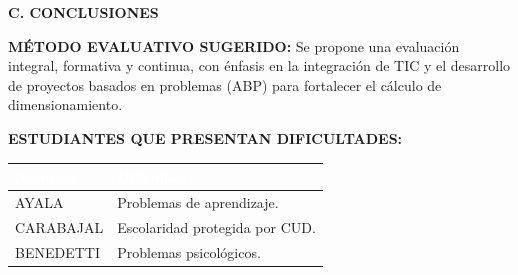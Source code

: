 \documentclass[a4paper,12pt]{article}
\begin{document}
\vspace{0.5cm}

\begin{center}\fontsize{12pt}{14pt}\selectfont \textbf{\uppercase{C. CONCLUSIONES}}\end{center}

\textbf{MÉTODO EVALUATIVO SUGERIDO:}
Se propone una evaluación integral, formativa y continua, con énfasis en la integración de TIC y el desarrollo de proyectos basados en problemas (ABP) para fortalecer el cálculo de dimensionamiento.

\vspace{0.3cm}
\textbf{ESTUDIANTES QUE PRESENTAN DIFICULTADES:}

\begin{center}
\begin{tabular}{|p{7cm}|p{8cm}|}
  \hline
  \rowcolor{headerblue}
  \textcolor{white}{\textbf{Alumnos}} & \textcolor{white}{\textbf{Dificultad}} \\
  \hline
  AYALA & Problemas de aprendizaje.\\
  \hline
  CARABAJAL & Escolaridad protegida por CUD.\\
  \hline
  BENEDETTI & Problemas psicológicos.\\
  \hline
\end{tabular}
\end{center}
\end{document}
